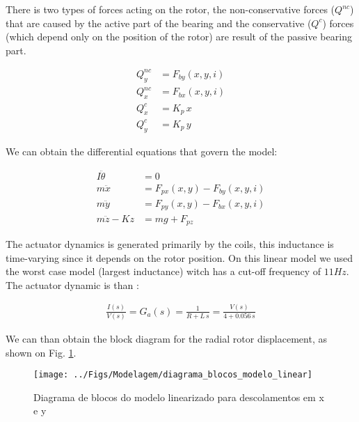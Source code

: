 \documentclass[10pt,fleqn,a4paper,twoside]{article}
\begin{document}
There is two types of forces acting on the rotor, the  non-conservative forces ($Q^{nc}$) that are caused by the active part of the bearing and the conservative ($Q^{c}$) forces (which depend only on the position of the rotor) are result of the passive bearing part.
 
  \begin{align}
  	Q_y^{nc} &= F_{by}(x,y,i)  \\
  	Q_x^{nc} &= F_{bx}(x,y,i)  \\
	Q^{c}_x &= K_p \, x \\
	Q^{c}_y &= K_p \, y 
  \end{align}
  
    We can obtain the differential equations that govern the model:

  
   \begin{align}
  	I \ddot{\theta} &= 0 \\
  	m \ddot{x}		&=  F_{px}(x,y) - F_{by}(x,y,i) \\
  	m \ddot{y}		&=  F_{py}(x,y) - F_{bx}(x,y,i)\\	
  	m \ddot{z} - K z &= m g  + F_{pz}
   \end{align}
   

The actuator dynamics is generated primarily by the coils,  this inductance is time-varying since it depends on the rotor position. On this linear model we used the worst case model (largest inductance) witch has a cut-off frequency of $11Hz$. The actuator dynamic is than :

\begin{align}
	\frac{I(s)}{V(s)} = G_a(s) = \frac{1}{R + L \, s} = \frac{V(s)}{4 + 0.056 \, s}
\end{align}

We can than obtain the block diagram for the radial rotor displacement, as shown on Fig. \ref{fig:diagrama:blocos:modelo:linear}.

\begin{figure}[th!]
\centering
\texttt{[image: ../Figs/Modelagem/diagrama\_blocos\_modelo\_linear]}
\caption{Diagrama de blocos do modelo linearizado para descolamentos em x e y}
\label{fig:diagrama:blocos:modelo:linear}
\end{figure}
\end{document}
